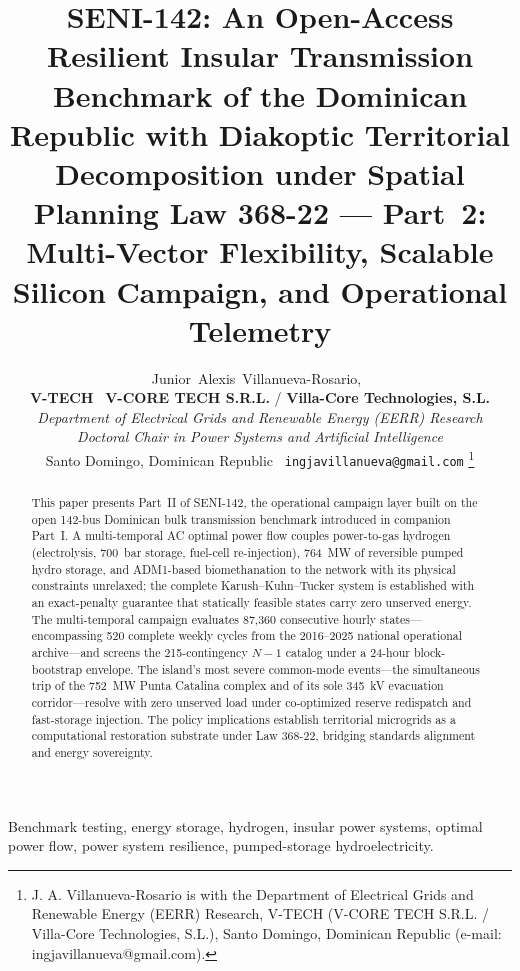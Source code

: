 \documentclass[11pt, journal, onecolumn]{IEEEtran}
\title{SENI-142: An Open-Access Resilient Insular Transmission Benchmark of the Dominican Republic with Diakoptic Territorial Decomposition under Spatial Planning Law 368-22 --- Part~2: Multi-Vector Flexibility, Scalable Silicon Campaign, and Operational Telemetry}
\author{Junior~Alexis~Villanueva-Rosario,~\IEEEmembership{Ms.C., Ph.D.(c)}\\[0.3em]
{\normalsize\textnormal{\textbf{V-TECH} \textbar\ \textbf{V-CORE TECH S.R.L.} / \textbf{Villa-Core Technologies, S.L.}}}\\[0.15em]
{\footnotesize\textnormal{\textit{Department of Electrical Grids and Renewable Energy (EERR) Research}}}\\[0.15em]
{\footnotesize\textnormal{\textit{Doctoral Chair in Power Systems and Artificial Intelligence}}}\\[0.15em]
{\footnotesize\textnormal{Santo Domingo, Dominican Republic \textbar\ \texttt{ingjavillanueva@gmail.com}}}%
\thanks{J. A. Villanueva-Rosario is with the Department of Electrical Grids and Renewable Energy (EERR) Research, V-TECH (V-CORE TECH S.R.L. / Villa-Core Technologies, S.L.), Santo Domingo, Dominican Republic (e-mail: ingjavillanueva@gmail.com).}}
\begin{document}
\maketitle
\begin{abstract}
This paper presents Part~II of SENI-142, the operational campaign layer built on the open 142-bus Dominican bulk transmission benchmark introduced in companion Part~I. A multi-temporal AC optimal power flow couples power-to-gas hydrogen (electrolysis, 700~bar storage, fuel-cell re-injection), 764~MW of reversible pumped hydro storage, and ADM1-based biomethanation to the network with its physical constraints unrelaxed; the complete Karush--Kuhn--Tucker system is established with an exact-penalty guarantee that statically feasible states carry zero unserved energy. The multi-temporal campaign evaluates 87,360 consecutive hourly states---encompassing 520 complete weekly cycles from the 2016--2025 national operational archive---and screens the 215-contingency $N-1$ catalog under a 24-hour block-bootstrap envelope. The island's most severe common-mode events---the simultaneous trip of the 752~MW Punta Catalina complex and of its sole 345~kV evacuation corridor---resolve with zero unserved load under co-optimized reserve redispatch and fast-storage injection. The policy implications establish territorial microgrids as a computational restoration substrate under Law 368-22, bridging standards alignment and energy sovereignty.
\end{abstract}

\begin{IEEEkeywords}
Benchmark testing, energy storage, hydrogen, insular power systems, optimal power flow, power system resilience, pumped-storage hydroelectricity.
\end{IEEEkeywords}

\setlength{\textfloatsep}{12pt plus 2pt minus 4pt}%
\setlength{\dbltextfloatsep}{12pt plus 2pt minus 4pt}%
\setlength{\abovedisplayskip}{7pt plus 2pt minus 3pt}%
\setlength{\belowdisplayskip}{7pt plus 2pt minus 3pt}%
\setlength{\abovedisplayshortskip}{3pt plus 1pt minus 2pt}%
\setlength{\belowdisplayshortskip}{4pt plus 1pt minus 2pt}%







\end{document}
